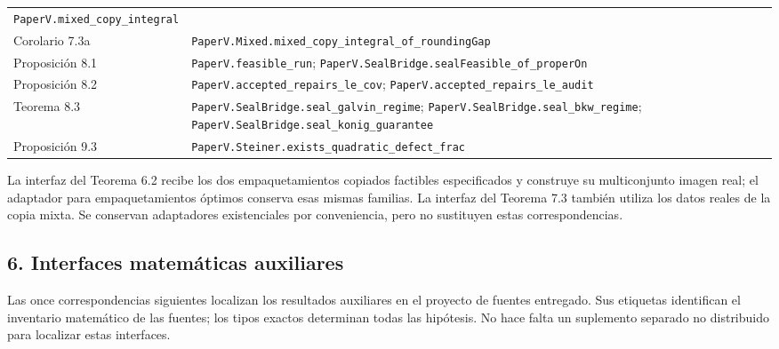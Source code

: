 \documentclass[spanish,11pt,a4paper]{article}
\begin{document}
{\begin{longtable}[]{@{}
  >{\raggedright\arraybackslash}p{}
  >{\raggedright\arraybackslash}p{}@{}}
\nolinkurl{PaperV.mixed_copy_integral} \\
Corolario 7.3a &
\nolinkurl{PaperV.Mixed.mixed_copy_integral_of_roundingGap} \\
Proposición 8.1 & \nolinkurl{PaperV.feasible_run};
\nolinkurl{PaperV.SealBridge.sealFeasible_of_properOn} \\
Proposición 8.2 & \nolinkurl{PaperV.accepted_repairs_le_cov};
\nolinkurl{PaperV.accepted_repairs_le_audit} \\
Teorema 8.3 & \nolinkurl{PaperV.SealBridge.seal_galvin_regime};
\nolinkurl{PaperV.SealBridge.seal_bkw_regime};
\nolinkurl{PaperV.SealBridge.seal_konig_guarantee} \\
Proposición 9.3 &
\nolinkurl{PaperV.Steiner.exists_quadratic_defect_frac} \\
\end{longtable}
}

La interfaz del Teorema 6.2 recibe los dos empaquetamientos copiados
factibles especificados y construye su multiconjunto imagen real; el
adaptador para empaquetamientos óptimos conserva esas mismas familias.
La interfaz del Teorema 7.3 también utiliza los datos reales de la copia
mixta. Se conservan adaptadores existenciales por conveniencia, pero no
sustituyen estas correspondencias.

\subsection{6. Interfaces matemáticas
auxiliares}\label{interfaces-matemuxe1ticas-auxiliares}

Las once correspondencias siguientes localizan los resultados auxiliares
en el proyecto de fuentes entregado. Sus etiquetas identifican el
inventario matemático de las fuentes; los tipos exactos determinan todas
las hipótesis. No hace falta un suplemento separado no distribuido para
localizar estas interfaces.
\end{document}

